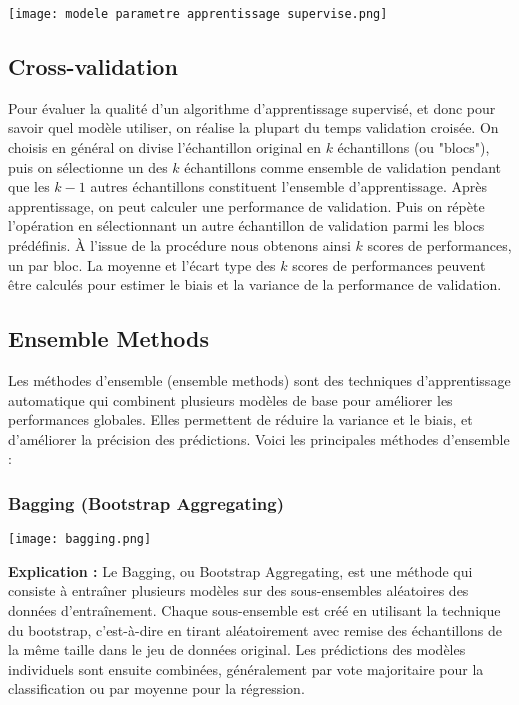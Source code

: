 \documentclass[10pt,a4paper]{article}
\begin{document}
\texttt{[image: modele parametre apprentissage supervise.png]}

\subsection*{Cross-validation}

Pour évaluer la qualité d'un algorithme d'apprentissage supervisé, et donc pour savoir quel modèle utiliser, on réalise la plupart du temps validation croisée. On choisis en général on divise l'échantillon original en $k$ échantillons (ou "blocs"), puis on sélectionne un des $k$ échantillons comme ensemble de validation pendant que les $k-1$ autres échantillons constituent l'ensemble d'apprentissage. Après apprentissage, on peut calculer une performance de validation. Puis on répète l'opération en sélectionnant un autre échantillon de validation parmi les blocs prédéfinis. À l'issue de la procédure nous obtenons ainsi $k$ scores de performances, un par bloc. La moyenne et l'écart type des $k$ scores de performances peuvent être calculés pour estimer le biais et la variance de la performance de validation.

\subsection*{Ensemble Methods}

Les méthodes d'ensemble (ensemble methods) sont des techniques d'apprentissage automatique qui combinent plusieurs modèles de base pour améliorer les performances globales. Elles permettent de réduire la variance et le biais, et d'améliorer la précision des prédictions. Voici les principales méthodes d'ensemble :

\subsubsection*{Bagging (Bootstrap Aggregating)}

\texttt{[image: bagging.png]}

\textbf{Explication :}
Le Bagging, ou Bootstrap Aggregating, est une méthode qui consiste à entraîner plusieurs modèles sur des sous-ensembles aléatoires des données d'entraînement. Chaque sous-ensemble est créé en utilisant la technique du bootstrap, c'est-à-dire en tirant aléatoirement avec remise des échantillons de la même taille dans le jeu de données original. Les prédictions des modèles individuels sont ensuite combinées, généralement par vote majoritaire pour la classification ou par moyenne pour la régression.
\end{document}
